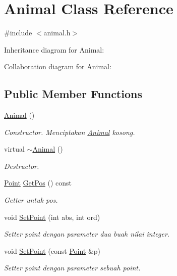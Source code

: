 \hypertarget{classAnimal}{}\section{Animal Class Reference}
\label{classAnimal}


{\ttfamily \#include $<$animal.\+h$>$}



Inheritance diagram for Animal\+:


Collaboration diagram for Animal\+:
\subsection*{Public Member Functions}
\begin{DoxyCompactItemize}
\item 
\hyperlink{classAnimal_a1e726a49ec952443190ac62dad22353c}{Animal} ()
\begin{DoxyCompactList}\small\item\em Constructor. Menciptakan \hyperlink{classAnimal}{Animal} kosong. \end{DoxyCompactList}\item 
virtual \hyperlink{classAnimal_a16d8b7f94611cc65f5cdb58cc105527b}{$\sim$\+Animal} ()
\begin{DoxyCompactList}\small\item\em Destructor. \end{DoxyCompactList}\item 
\hyperlink{classPoint}{Point} \hyperlink{classAnimal_a183e4addbbccbe06a77e57bc8893cec1}{Get\+Pos} () const 
\begin{DoxyCompactList}\small\item\em Getter untuk pos. \end{DoxyCompactList}\item 
void \hyperlink{classAnimal_a754c7eb7a8ca6d8bd3e30650546a410d}{Set\+Point} (int abs, int ord)
\begin{DoxyCompactList}\small\item\em Setter point dengan parameter dua buah nilai integer. \end{DoxyCompactList}\item 
void \hyperlink{classAnimal_a02e187a6407bc83c46698544c912be15}{Set\+Point} (const \hyperlink{classPoint}{Point} \&p)
\begin{DoxyCompactList}\small\item\em Setter point dengan parameter sebuah point. \end{DoxyCompactList}\item 

\end{DoxyCompactItemize}
